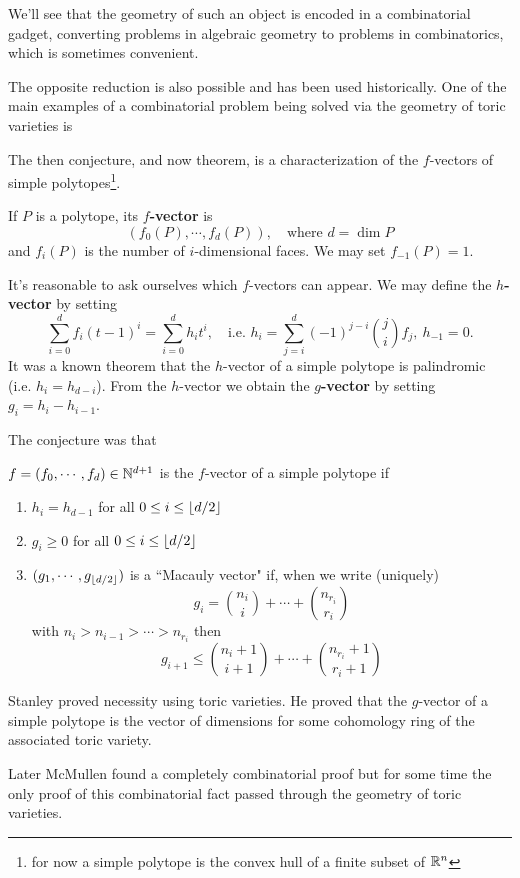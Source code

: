 We'll see that the geometry of such an object is encoded in a combinatorial gadget, converting problems in algebraic geometry to problems in combinatorics, which is sometimes convenient.

The opposite reduction is also possible and has been used historically. One of the main examples of a combinatorial problem being solved via the geometry of toric varieties is
\begin{example}

The then conjecture, and now theorem, is a characterization of the $f$-vectors of simple polytopes\footnote{for now a simple polytope is the convex hull of a finite subset of $\mathbb{R}^n$}.

\begin{definition}[$f$-vectors]
If $P$ is a polytope, its \textbf{$f$-vector} is 
\[(f_0(P),\cdots, f_d(P)),\quad \text{where $d=\dim P$}\]
and $f_i(P)$ is the number of $i$-dimensional faces. We may set $f_{-1}(P)=1$.
\end{definition}

It's reasonable to ask ourselves which $f$-vectors can appear. We may define the \textbf{$h$-vector} by setting
\[\sum_{i=0}^d f_i (t-1)^i=\sum_{i=0}^dh_i t^i,\quad \text{i.e. }h_i=\sum_{j=i}^d(-1)^{j-i}\binom{j}if_j,\ h_{-1}=0.\]
It was a known theorem that the $h$-vector of a simple polytope is palindromic (i.e. $h_i=h_{d-i}$).
From the $h$-vector we obtain the \textbf{$g$-vector} by setting $g_i=h_i-h_{i-1}$. 

The conjecture was that
\begin{theorem}[$g$-conjecture]
$f=(f_0,\cdots, f_d)\in \mathbb{N}^{d+1}$ is the $f$-vector of a simple polytope if
\begin{enumerate}
\item $h_i=h_{d-1}$ for all $0\leq i\leq \left\lfloor {d/2}\right\rfloor$
\item $g_i\geq 0$ for all $0\leq i\leq \left\lfloor {d/2}\right\rfloor$
\item $(g_1,\cdots, g_{\left\lfloor {d/2}\right\rfloor})$ is a ``Macauly vector" if, when we write (uniquely)
\[g_i=\binom{n_i}i+\cdots+\binom{n_{r_i}}{r_i}\]
with $n_i>n_{i-1}>\cdots>n_{r_i}$ then
\[g_{i+1}\leq \binom{n_i+1}{i+1}+\cdots+\binom{n_{r_i}+1}{r_i+1}\]
\end{enumerate}
\end{theorem}
Stanley proved necessity using toric varieties. He proved that the $g$-vector of a simple polytope is the vector of dimensions for some cohomology ring of the associated toric variety.


Later McMullen found a completely combinatorial proof but for some time the only proof of this combinatorial fact passed through the geometry of toric varieties.
\end{example}